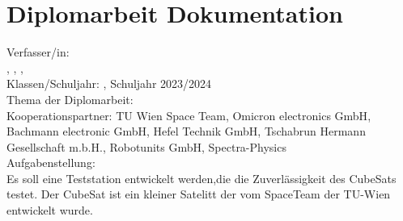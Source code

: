 

\section{Diplomarbeit Dokumentation}
\vspace{3mm}
 Verfasser/in:\\
\nameSH, \nameJS, \nameCZ, \nameSB\\ 
\vspace{3mm}
Klassen/Schuljahr: \klasse, Schuljahr 2023/2024\\
\vspace{3mm}
Thema der Diplomarbeit: \Thema\\
\vspace{3mm}
Kooperationspartner: TU Wien Space Team\autocite{TU_Wien_Spaceteam}, Omicron electronics GmbH\autocite{OMICRON_electronics_GmbH}, Bachmann electronic GmbH\autocite{Bachmann_electronic_GmbH}, Hefel Technik GmbH\autocite{Hefel_Technik_GmbH}, Tschabrun Hermann Gesellschaft m.b.H.\autocite{Tschabrun_Hermann_Gesellschaft}, Robotunits GmbH\autocite{robogmbh}, Spectra-Physics \autocite{Spectra} \\
\vspace{3mm}
Aufgabenstellung:\\
Es soll eine Teststation entwickelt werden,die die Zuverlässigkeit des CubeSats testet. Der CubeSat ist ein kleiner Satelitt der vom SpaceTeam der TU-Wien entwickelt wurde.\\    

